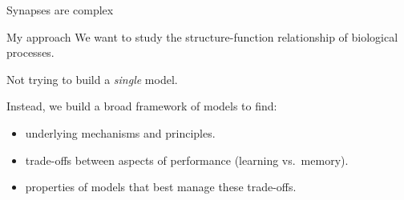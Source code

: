 \documentclass[final]{beamer}%
\begin{document}

\begin{frame}{Synapses are complex}
%
\only<2-3>{
 \parbox[t]{0.225\linewidth}{%
 \texttt{[image: 2000102CobaFig4.pdf]}

 \citerr{Coba2009phosphorylation}
 }
 \hfill
 \parbox[t]{0.45\linewidth}{%
 \hfill
 \texttt{[image: MadisonMontgomery.jpg]}

 \citerr{Montgomery2002765}
 }

 \vp\vp
 \aligntop{\texttt{[image: cascade.svg]}}
 \hp
 \parbox[t]{0.5\linewidth}{
   Capacity \alert{$\propto N^{2/3}$}.
   \citerr{Fusi2005cascade}

   \invisible<2>{
   Capacity \alert{$\propto N$}.
   \citerr{Benna2015complex}
   }
 }
}%
%
\end{frame}


\begin{frame}{My approach}
%
 We want to study the structure-function relationship of biological processes.

 \vp Not trying to build a \emph{single} model.

 \vp Instead, we build a broad framework of models to find:

 \begin{itemize}
   \item[\lto] underlying mechanisms and principles.

   \vpp\item[\lto] trade-offs between aspects of performance (\eg learning vs.\ memory).

   \vpp\item[\lto] properties of models that best manage these trade-offs.
 \end{itemize}
%
\end{frame}

\end{document}
